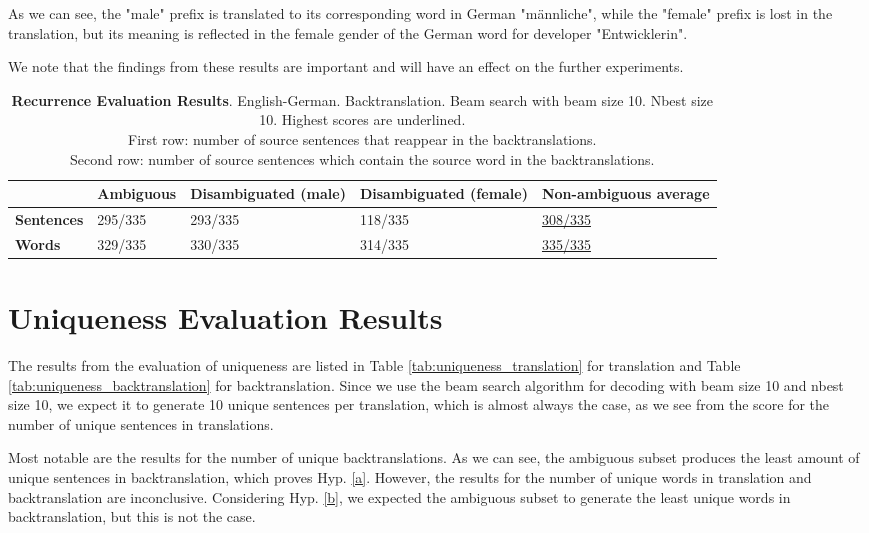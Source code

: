 As we can see, the "male" prefix is translated to its corresponding word in German "männliche", while the "female" prefix is lost in the translation, but its meaning is reflected in the female gender of the German word for developer "Entwicklerin".

We note that the findings from these results are important and will have an effect on the further experiments.

\begin{table} 
    \label{tab:recurrence}
    \begin{tabularx}{\linewidth}{|X|XXXX|}
        \hline
         & \textbf{Ambiguous} & \textbf{Disambiguated (male)} & \textbf{Disambiguated (female)} & \textbf{Non-ambiguous average} \\ \hline
         \textbf{Sentences} & 295/335 & 293/335 & 118/335 & \underline{308/335} \\ 
         \textbf{Words} & 329/335 & 330/335 & 314/335 & \underline{335/335} \\ \hline
    \end{tabularx}
    \caption{\textbf{Recurrence Evaluation Results}. English-German. Backtranslation. Beam search with beam size 10. Nbest size 10. Highest scores are underlined. \\ First row: number of source sentences that reappear in the backtranslations. \\ Second row: number of source sentences which contain the source word in the backtranslations.}
\end{table}

\section{Uniqueness Evaluation Results}
\label{ch:Results:Uniqueness}

The results from the evaluation of uniqueness are listed in Table \ref{tab:uniqueness_translation} for translation and Table \ref{tab:uniqueness_backtranslation} for backtranslation.
Since we use the beam search algorithm for decoding with beam size 10 and nbest size 10, we expect it to generate 10 unique sentences per translation, which is almost always the case, as we see from the score for the number of unique sentences in translations. 

Most notable are the results for the number of unique backtranslations. As we can see, the ambiguous subset produces the least amount of unique sentences in backtranslation, which proves Hyp. \ref{a}. However, the results for the number of unique words in translation and backtranslation are inconclusive. Considering Hyp. \ref{b}, we expected the ambiguous subset to generate the least unique words in backtranslation, but this is not the case.


